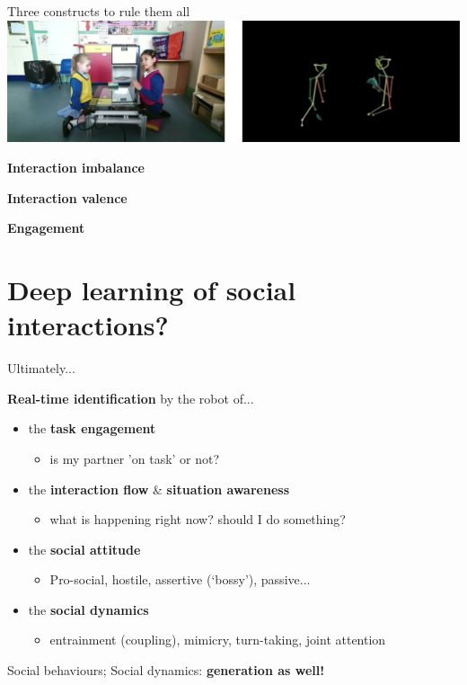 \documentclass[xcolor=table]{beamer}
\begin{document}
\begin{frame}{Three constructs to rule them all}
        \centering
        \includegraphics[width=0.9\linewidth]{kinematics_social_dynamics/clips.jpg}

    \textbf{Interaction imbalance}
    
    \textbf{Interaction valence}
    
    \textbf{Engagement}

\end{frame}

\section[DNNs for Social Robotics]{Deep learning of social interactions?}


\begin{frame}{Ultimately...}

    {\bf Real-time identification} by the robot of...

    \begin{itemize}
        \item<+-> the \textbf{task engagement}
            \begin{itemize}
                \item is my partner 'on task' or not?
            \end{itemize}
        \item<+-> the \textbf{interaction flow} \& \textbf{situation awareness}
            \begin{itemize}
                \item what is happening right now? should I do something?
            \end{itemize}
        \item<+-> the \textbf{social attitude}
            \begin{itemize}
                \item Pro-social, hostile, assertive (‘bossy’), passive...
            \end{itemize}
        \item<+-> the \textbf{social dynamics}
            \begin{itemize}
                \item entrainment (coupling), mimicry, turn-taking, joint
                    attention
            \end{itemize}
    \end{itemize}

    \pause

    Social behaviours; Social dynamics: \textbf{generation as well!}
\end{frame}
\end{document}
